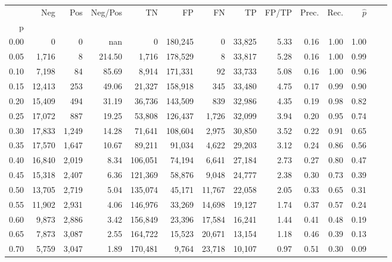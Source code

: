 \begin{tabular}{rrrrrrrrrrrrrr}
\toprule
{} &     Neg &    Pos & Neg/Pos &       TN &       FP &      FN &      TP & FP/TP & Prec. &  Rec. & $\hat{p}$ \\
p    &         &        &         &          &          &         &         &       &       &       &           \\
\midrule
0.00 &       0 &      0 &     nan &        0 &  180,245 &       0 &  33,825 &  5.33 &  0.16 &  1.00 &      1.00 \\
0.05 &   1,716 &      8 &  214.50 &    1,716 &  178,529 &       8 &  33,817 &  5.28 &  0.16 &  1.00 &      0.99 \\
0.10 &   7,198 &     84 &   85.69 &    8,914 &  171,331 &      92 &  33,733 &  5.08 &  0.16 &  1.00 &      0.96 \\
0.15 &  12,413 &    253 &   49.06 &   21,327 &  158,918 &     345 &  33,480 &  4.75 &  0.17 &  0.99 &      0.90 \\
0.20 &  15,409 &    494 &   31.19 &   36,736 &  143,509 &     839 &  32,986 &  4.35 &  0.19 &  0.98 &      0.82 \\
0.25 &  17,072 &    887 &   19.25 &   53,808 &  126,437 &   1,726 &  32,099 &  3.94 &  0.20 &  0.95 &      0.74 \\
0.30 &  17,833 &  1,249 &   14.28 &   71,641 &  108,604 &   2,975 &  30,850 &  3.52 &  0.22 &  0.91 &      0.65 \\
0.35 &  17,570 &  1,647 &   10.67 &   89,211 &   91,034 &   4,622 &  29,203 &  3.12 &  0.24 &  0.86 &      0.56 \\
0.40 &  16,840 &  2,019 &    8.34 &  106,051 &   74,194 &   6,641 &  27,184 &  2.73 &  0.27 &  0.80 &      0.47 \\
0.45 &  15,318 &  2,407 &    6.36 &  121,369 &   58,876 &   9,048 &  24,777 &  2.38 &  0.30 &  0.73 &      0.39 \\
0.50 &  13,705 &  2,719 &    5.04 &  135,074 &   45,171 &  11,767 &  22,058 &  2.05 &  0.33 &  0.65 &      0.31 \\
0.55 &  11,902 &  2,931 &    4.06 &  146,976 &   33,269 &  14,698 &  19,127 &  1.74 &  0.37 &  0.57 &      0.24 \\
0.60 &   9,873 &  2,886 &    3.42 &  156,849 &   23,396 &  17,584 &  16,241 &  1.44 &  0.41 &  0.48 &      0.19 \\
0.65 &   7,873 &  3,087 &    2.55 &  164,722 &   15,523 &  20,671 &  13,154 &  1.18 &  0.46 &  0.39 &      0.13 \\
0.70 &   5,759 &  3,047 &    1.89 &  170,481 &    9,764 &  23,718 &  10,107 &  0.97 &  0.51 &  0.30 &      0.09 \\

\end{tabular}
